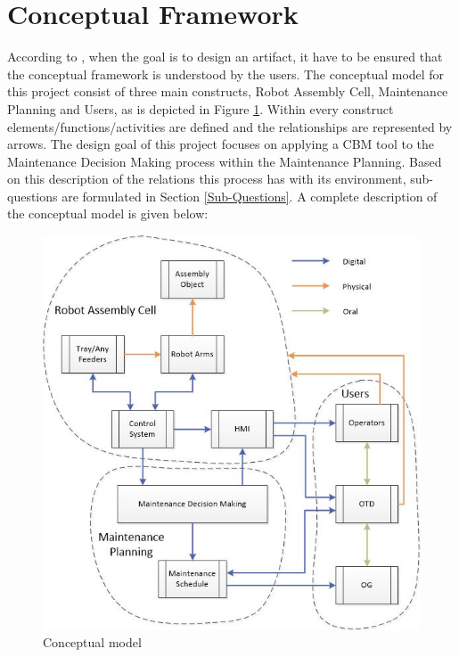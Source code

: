 \section{Conceptual Framework} \label{Conceptual Framework}
According to \citet{Wieringa2014}, when the goal is to design an artifact, it have to be ensured that the conceptual framework is understood by the users. The conceptual model for this project consist of three main constructs, Robot Assembly Cell, Maintenance Planning and Users, as is depicted in Figure \ref{fig:conceptual model}. Within every construct elements/functions/activities are defined and the relationships are represented by arrows. The design goal of this project focuses on applying a CBM tool to the Maintenance Decision Making process within the Maintenance Planning. Based on this description of the relations this process has with its environment, sub-questions are formulated in Section \ref{Sub-Questions}. A complete description of the conceptual model is given below:
\begin{figure}[ht]
\centering
\includegraphics[width=\textwidth]{Figures/Conceptual_Model}
\caption[Conceptual model]{Conceptual model}
\label{fig:conceptual model}
\end{figure}

